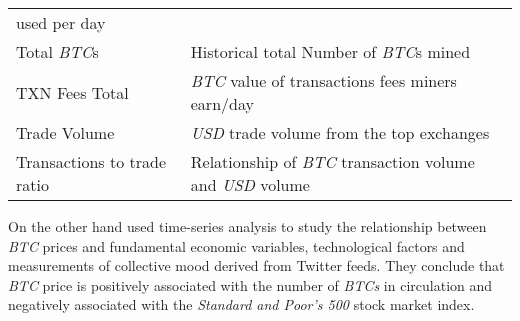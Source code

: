 \begin{table}[htb]
\begin{tabularx}{\textwidth}{XX}
                                 used per day \\
    Total \textit{BTC}s & Historical total Number of \textit{BTC}s mined \\
    TXN Fees Total & \textit{BTC} value of transactions fees miners earn/day \\
    Trade Volume & \textit{USD} trade volume from the top exchanges \\
    Transactions to trade ratio & Relationship of \textit{BTC} transaction
                                  volume and \textit{USD} volume \\
    \bottomrule
  \end{tabularx}
  \label{tab:bitcoin-features-madan}
\end{table}

On the other hand \cite{georgoula_using_2015} used time-series
analysis to study the relationship between \textit{BTC} prices and
fundamental economic variables, technological factors and measurements
of collective mood derived from Twitter feeds. They conclude that
\textit{BTC} price is positively associated with the number of
\textit{BTCs} in circulation and negatively associated with the
\textit{Standard and Poor's 500} stock market index.


